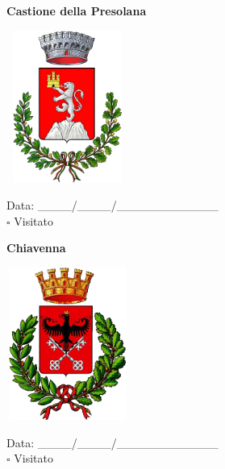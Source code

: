 \documentclass[a5paper,12pt]{article}
\begin{document}
\newpage

\noindent
\begin{minipage}[t]{0.45\textwidth}
    \begin{center}
        \textbf{Castione della Presolana}
    \end{center}
    \vspace{-0.5cm} %
    \begin{center}
        \includegraphics[height= 5cm, width=4cm]{Lombardia/Stemma Castione della Presolana.png}
    \end{center}
    \vspace{-0.4cm} %
    \begin{flushleft}
        Data: \_\_\_\_/\_\_\_\_/\_\_\_\_\_\_\_\_\_\_\_\_ \\
        $\square$ Visitato
    \end{flushleft}
\end{minipage}
\hfill
\noindent
\begin{minipage}[t]{0.45\textwidth}
    \begin{center}
        \textbf{Chiavenna}
    \end{center}
    \vspace{-0.5cm} %
    \begin{center}
        \includegraphics[height= 5cm, width=4cm]{Lombardia/Stemma Chiavenna.png}
    \end{center}
    \vspace{-0.4cm} %
    \begin{flushleft}
        Data: \_\_\_\_/\_\_\_\_/\_\_\_\_\_\_\_\_\_\_\_\_ \\
        $\square$ Visitato
    \end{flushleft}
\end{minipage}
\end{document}
